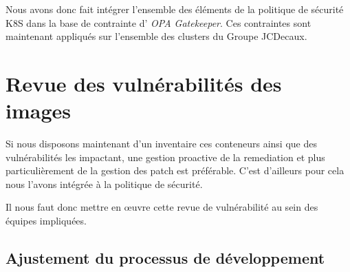 Nous avons donc fait intégrer l'ensemble des éléments de la politique de sécurité \ac{K8S} dans la base de contrainte d'
\emph{OPA Gatekeeper}. Ces contraintes sont maintenant appliqués sur l'ensemble des clusters du Groupe JCDecaux.
\newpage

\section{Revue des vulnérabilités des images} \label{section:revue-vul-img}
Si nous disposons maintenant d'un inventaire ces conteneurs ainsi que des vulnérabilités les impactant, une gestion 
proactive de la remediation et plus particulièrement de la gestion des patch est préférable. C'est d'ailleurs pour cela 
nous l'avons intégrée à la politique de sécurité.

Il nous faut donc mettre en œuvre cette revue de vulnérabilité au sein des équipes impliquées.

\subsection{Ajustement du processus de développement}

